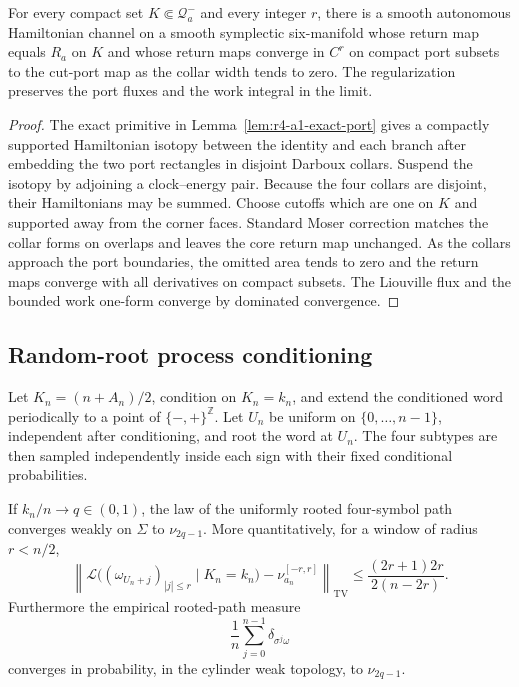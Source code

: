 \begin{theorem}
\label{thm:r4-a1-collar}
For every compact set \(K\Subset\mathcal Q_a^-\) and every integer \(r\),
there is a smooth autonomous Hamiltonian channel on a smooth symplectic
six-manifold whose return map equals \(R_a\) on \(K\) and whose return maps
converge in \(C^r\) on compact port subsets to the cut-port map as the collar
width tends to zero.  The regularization preserves the port fluxes and the
work integral in the limit.
\end{theorem}

\begin{proof}
The exact primitive in Lemma~\ref{lem:r4-a1-exact-port} gives a compactly
supported Hamiltonian isotopy between the identity and each branch after
embedding the two port rectangles in disjoint Darboux collars.  Suspend the
isotopy by adjoining a clock--energy pair.  Because the four collars are
disjoint, their Hamiltonians may be summed.  Choose cutoffs which are one on
\(K\) and supported away from the corner faces.  Standard Moser correction
matches the collar forms on overlaps and leaves the core return map unchanged.
As the collars approach the port boundaries, the omitted area tends to zero
and the return maps converge with all derivatives on compact subsets.  The
Liouville flux and the bounded work one-form converge by dominated
convergence.
\end{proof}

\subsection{Random-root process conditioning}

Let \(K_n=(n+A_n)/2\), condition on \(K_n=k_n\), and extend the conditioned
word periodically to a point of \(\{-,+\}^{\mathbb Z}\).  Let \(U_n\) be
uniform on \(\{0,\ldots,n-1\}\), independent after conditioning, and root the
word at \(U_n\).  The four subtypes are then sampled independently inside
each sign with their fixed conditional probabilities.

\begin{theorem}
\label{thm:r3-a1-root}
If \(k_n/n\to q\in(0,1)\), the law of the uniformly rooted four-symbol path
converges weakly on \(\Sigma\) to \(\nu_{2q-1}\).  More quantitatively, for a
window of radius \(r<n/2\),
\[
 \left\|
 \mathcal L\big((\omega_{U_n+j})_{|j|\le r}\mid K_n=k_n\big)
 -\nu_{a_n}^{[-r,r]}
 \right\|_{\mathrm{TV}}
 \le \frac{(2r+1)2r}{2(n-2r)}.
\]
Furthermore the empirical rooted-path measure
\[
 \frac1n\sum_{j=0}^{n-1}
 \delta_{\sigma^j\omega}
\]
converges in probability, in the cylinder weak topology, to
\(\nu_{2q-1}\).
\end{theorem}

